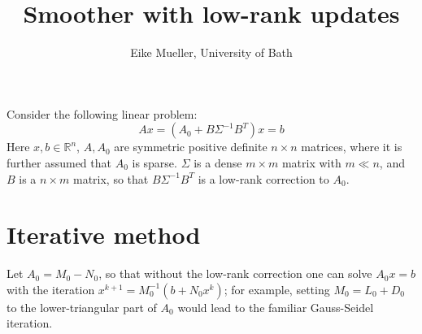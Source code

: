 \documentclass[11pt]{article}
\title{Smoother with low-rank updates}
\author{Eike Mueller, University of Bath}
\begin{document}
\maketitle
Consider the following linear problem:
\begin{equation}
    Ax = \left(A_0 + B \Sigma^{-1} B^T \right)x = b\label{eqn:linear_system}
\end{equation}
Here $x,b\in\mathbb{R}^n$, $A,A_0$ are symmetric positive definite $n\times n$ matrices, where it is further assumed that $A_0$ is sparse. $\Sigma$ is a dense $m\times m$ matrix with $m\ll n$, and $B$ is a $n\times m$ matrix, so that $B\Sigma^{-1}B^T$ is a low-rank correction to $A_0$.
\section{Iterative method}
Let $A_0 = M_0-N_0$, so that without the low-rank correction one can solve $A_0x=b$ with the iteration $x^{k+1} = M_0^{-1}(b + N_0x^k)$; for example, setting $M_0 = L_0 + D_0$ to the lower-triangular part of $A_0$ would lead to the familiar Gauss-Seidel iteration.
\end{document}
